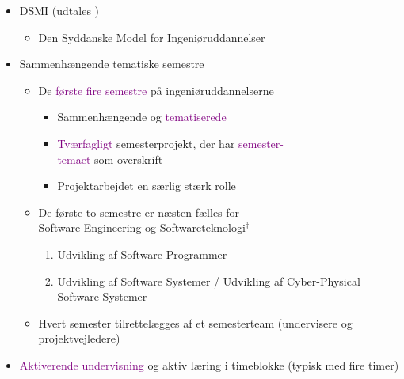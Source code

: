 {\begin{frame}[fragile]
  \vspace{0mm}
  \begin{itemize}
    \pause
    \item DSMI (udtales )
      \begin{itemize}
        \item Den Syddanske Model for Ingeniøruddannelser
      \end{itemize}
    \pause
    \item Sammenhængende tematiske semestre
      \begin{itemize}
        \item De \textcolor{purple}{første fire semestre} på ingeniøruddannelserne
          \begin{itemize}
            \item Sammenhængende og \textcolor{purple}{tematiserede}
            \item \textcolor{purple}{Tværfagligt} semesterprojekt, der har \textcolor{purple}{semester-}\\\textcolor{purple}{temaet} som overskrift
            \item Projektarbejdet en særlig stærk rolle
          \end{itemize}
        \item De første to semestre er næsten fælles for\\Software Engineering og Softwareteknologi$^\dagger$
          \begin{enumerate}
            \item Udvikling af Software Programmer
            \item Udvikling af Software Systemer / Udvikling af Cyber-Physical Software Systemer
          \end{enumerate}
        \item Hvert semester tilrettelægges af et semesterteam (undervisere og projektvejledere)
      \end{itemize}
    \pause
    \item \textcolor{purple}{Aktiverende undervisning} og aktiv læring i timeblokke (typisk med fire timer)
  \end{itemize}
\end{frame}

}


